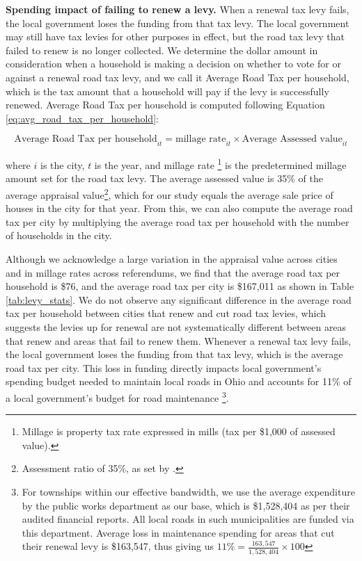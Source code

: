{\bf Spending impact of failing to renew a levy.} When a renewal tax levy fails, the local government loses the funding from that tax levy. The local government may still have tax levies for other purposes in effect, but the road tax levy that failed to renew is no longer collected. We determine the dollar amount in consideration when a household is making a decision on whether to vote for or against a renewal road tax levy, and we call it Average Road Tax per household, which is the tax amount that a household will pay if the levy is successfully renewed. Average Road Tax per household is computed following Equation \ref{eq:avg_road_tax_per_household}:

\begin{equation}
\text{Average Road Tax per household}_{it} = \text{millage rate}_{it} \times \text{Average Assessed value}_{it}
\label{eq:avg_road_tax_per_household}
\end{equation}

\noindent where $i$ is the city, $t$ is the year, and millage rate \footnote{Millage is property tax rate expressed in mills (tax per \$1,000 of assessed value).} is the predetermined millage amount set for the road tax levy. The average assessed value is 35\% of the average appraisal value\footnote{Assessment ratio of 35\%, as set by \cite{OhioRealPropertyTax}.}, which for our study equals the average sale price of houses in the city for that year. From this, we can also compute the average road tax per city by multiplying the average road tax per household with the number of households in the city.

Although we acknowledge a large variation in the appraisal value across cities and in millage rates across referendums, we find that the average road tax per household is \$76, and the average road tax per city is \$167,011 as shown in Table \ref{tab:levy_stats}. We do not observe any significant difference in the average road tax per household between cities that renew and cut road tax levies, which suggests the levies up for renewal are not systematically different between areas that renew and areas that fail to renew them. Whenever a renewal tax levy fails, the local government loses the funding from that tax levy, which is the average road tax per city. This loss in funding directly impacts local government's spending budget needed to maintain local roads in Ohio and accounts for 11\% of a local government's budget for road maintenance \footnote{For townships within our effective bandwidth, we use the average expenditure by the public works department as our base, which is \$1,528,404 as per their audited financial reports. All local roads in such municipalities are funded via this department. Average loss in maintenance spending for areas that cut their renewal levy is \$163,547, thus giving us $11\% = \frac{163,547}{1,528,404} \times 100$ }.

